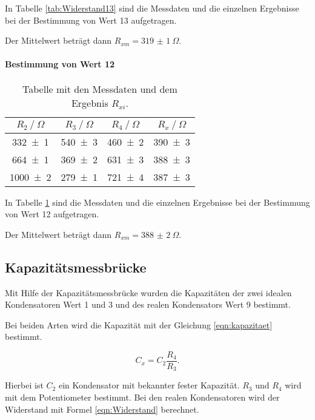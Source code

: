 In Tabelle \ref{tab:Widerstand13} sind die Messdaten und die einzelnen
Ergebnisse bei der Bestimmung von Wert 13 aufgetragen.

Der Mittelwert beträgt dann $R_{xm} = \SI{319(1)}{\Omega}$.

\FloatBarrier
\paragraph{Bestimmung von Wert 12}

\begin{table}
  \centering
  \caption{Tabelle mit den Messdaten und dem Ergebnis $R_{xi}$.}
  \label{tab:Widerstand12}
  \begin{tabular}{c c c c}
    \toprule
    $R_2 \ /\ \si{\Omega}$ & $R_3 \ /\ \si{\Omega}$ & $R_4 \ /\ \si{\Omega}$ & $R_x \ /\ \si{\Omega}$\\
    \midrule
    \num{332 +- 1} & \num{540 +- 3} & \num{460 +- 2} & \num{390 +- 3}\\
    \num{664 +- 1} & \num{369 +- 2} & \num{631 +- 3} & \num{388 +- 3}\\
    \num{1000 +- 2} & \num{279 +- 1} & \num{721 +- 4} & \num{387 +- 3}\\
    \bottomrule
  \end{tabular}
\end{table}

In Tabelle \ref{tab:Widerstand12} sind die Messdaten und die einzelnen
Ergebnisse bei der Bestimmung von Wert 12 aufgetragen.

Der Mittelwert beträgt dann $R_{xm} = \SI{388(2)}{\Omega}$.

\subsection{Kapazitätsmessbrücke}

Mit Hilfe der Kapazitätsmessbrücke wurden die Kapazitäten
der zwei idealen Kondensatoren Wert 1 und 3 und des realen
Kondensators Wert 9 bestimmt.

Bei beiden Arten wird die Kapazität mit der Gleichung \eqref{eqn:kapazitaet}
bestimmt.

\begin{equation}
  C_x = C_2\frac{R_4}{R_3}.
  \label{eqn:kapazitaet}
\end{equation}

Hierbei ist $C_2$ ein Kondensator mit bekannter fester Kapazität. $R_3$ und
$R_4$ wird mit dem Potentiometer bestimmt.
Bei den realen Kondensatoren wird  der Widerstand mit Formel
\eqref{eqn:Widerstand} berechnet.


